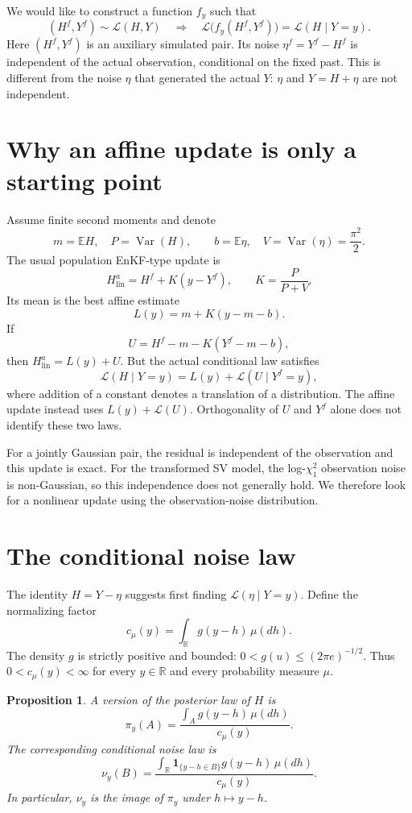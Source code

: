 \documentclass[11pt]{article}
\newtheorem{proposition}{Proposition}[section]
\newcommand{\E}{\mathbb E}
\newcommand{\R}{\mathbb R}
\newcommand{\Law}{\mathcal L}
\newcommand{\Var}{\operatorname{Var}}
\newcommand{\ind}{\mathbf 1}
\begin{document}
We would like to construct a function $f_y$ such that
\begin{equation}
(H^f,Y^f)\sim\Law(H,Y)
\quad\Longrightarrow\quad
\Law\bigl(f_y(H^f,Y^f)\bigr)=\Law(H\mid Y=y).
\label{eq:target}
\end{equation}
Here $(H^f,Y^f)$ is an auxiliary simulated pair. Its noise
$\eta^f=Y^f-H^f$ is independent of the actual observation, conditional
on the fixed past. This is different from the noise $\eta$ that
generated the actual $Y$: $\eta$ and $Y=H+\eta$ are not independent.

\section{Why an affine update is only a starting point}

Assume finite second moments and denote
\[
m=\E H,\quad P=\Var(H),\qquad
b=\E\eta,\quad V=\Var(\eta)=\frac{\pi^2}{2}.
\]
The usual population EnKF-type update is
\[
H^a_{\mathrm{lin}}=H^f+K(y-Y^f),\qquad K=\frac{P}{P+V}.
\]
Its mean is the best affine estimate
\[
L(y)=m+K(y-m-b).
\]
If
\[
U=H^f-m-K(Y^f-m-b),
\]
then $H^a_{\mathrm{lin}}=L(y)+U$. But the actual conditional law satisfies
\[
\Law(H\mid Y=y)=L(y)+\Law(U\mid Y^f=y),
\]
where addition of a constant denotes a translation of a distribution.
The affine update instead uses $L(y)+\Law(U)$. Orthogonality of
$U$ and $Y^f$ alone does not identify these two laws.

For a jointly Gaussian pair, the residual is independent of the
observation and this update is exact. For the transformed SV model,
the log-$\chi_1^2$ observation noise is non-Gaussian, so this independence
does not generally hold. We therefore look for a nonlinear update
using the observation-noise distribution.

\section{The conditional noise law}

The identity $H=Y-\eta$ suggests first finding $\Law(\eta\mid Y=y)$.
Define the normalizing factor
\[
c_\mu(y)=\int_\R g(y-h)\,\mu(dh).
\]
The density $g$ is strictly positive and bounded:
$0<g(u)\le (2\pi e)^{-1/2}$. Thus
$0<c_\mu(y)<\infty$ for every $y\in\R$ and every probability measure $\mu$.

\begin{proposition}
A version of the posterior law of $H$ is
\[
\pi_y(A)=\frac{\int_A g(y-h)\,\mu(dh)}{c_\mu(y)}.
\]
The corresponding conditional noise law is
\begin{equation}
\nu_y(B)
=\frac{\int_\R
\ind_{\{y-h\in B\}}g(y-h)\,\mu(dh)}{c_\mu(y)}.
\label{eq:conditional-noise}
\end{equation}
In particular, $\nu_y$ is the image of $\pi_y$ under $h\mapsto y-h$.
\end{proposition}
\end{document}
